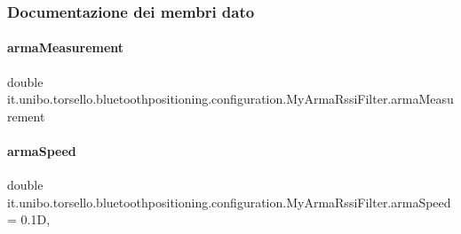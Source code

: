 \subsubsection{Documentazione dei membri dato}
\hypertarget{classit_1_1unibo_1_1torsello_1_1bluetoothpositioning_1_1configuration_1_1MyArmaRssiFilter_a2be11d7395143321b8f2063afe14a8d0_a2be11d7395143321b8f2063afe14a8d0}{}\label{classit_1_1unibo_1_1torsello_1_1bluetoothpositioning_1_1configuration_1_1MyArmaRssiFilter_a2be11d7395143321b8f2063afe14a8d0_a2be11d7395143321b8f2063afe14a8d0} 
\paragraph{\texorpdfstring{arma\+Measurement}{armaMeasurement}}
{\footnotesize\ttfamily double it.\+unibo.\+torsello.\+bluetoothpositioning.\+configuration.\+My\+Arma\+Rssi\+Filter.\+arma\+Measurement\hspace{0.3cm}{\ttfamily [private]}}

\hypertarget{classit_1_1unibo_1_1torsello_1_1bluetoothpositioning_1_1configuration_1_1MyArmaRssiFilter_a5332b55e26b28536d1f8c7cae5e684b4_a5332b55e26b28536d1f8c7cae5e684b4}{}\label{classit_1_1unibo_1_1torsello_1_1bluetoothpositioning_1_1configuration_1_1MyArmaRssiFilter_a5332b55e26b28536d1f8c7cae5e684b4_a5332b55e26b28536d1f8c7cae5e684b4} 
\paragraph{\texorpdfstring{arma\+Speed}{armaSpeed}}
{\footnotesize\ttfamily double it.\+unibo.\+torsello.\+bluetoothpositioning.\+configuration.\+My\+Arma\+Rssi\+Filter.\+arma\+Speed = 0.\+1D\hspace{0.3cm}{\ttfamily [static]}, {\ttfamily [private]}}

